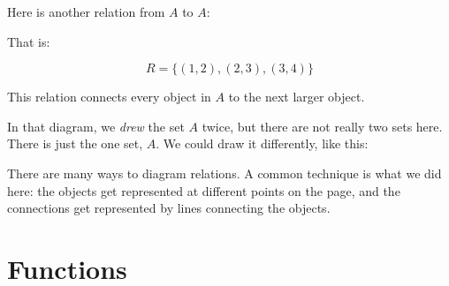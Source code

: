 \documentclass[../../../main.tex]{subfiles}
\begin{document}
Here is another relation from $A$ to $A$:

\begin{center}\end{center}

\noindent
That is:

\begin{equation*}
R = \{ (1, 2), (2, 3), (3, 4) \}
\end{equation*}

\noindent
This relation connects every object in $A$ to the next larger object.

In that diagram, we \textit{drew} the set $A$ twice, but there are not really two sets here. There is just the one set, $A$. We could draw it differently, like this:

\begin{center}\end{center}

There are many ways to diagram relations. A common technique is what we did here: the objects get represented at different points on the page, and the connections get represented by lines connecting the objects.


\section{Functions}
\end{document}
